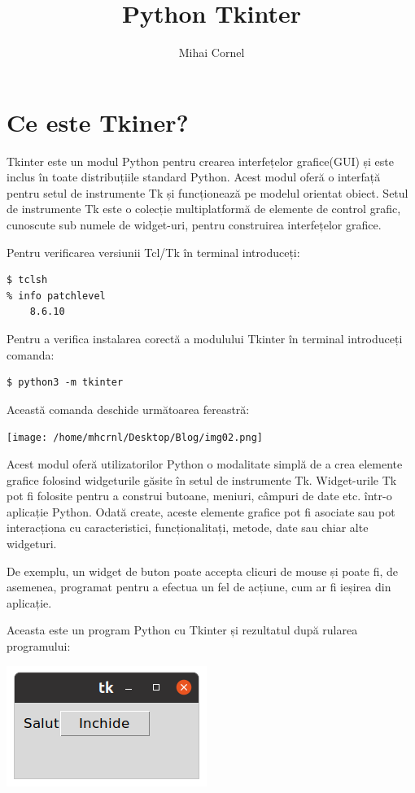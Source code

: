 \documentclass[12pt,a4paper]{book}
\author{Mihai Cornel}
\title{Python Tkinter}
\begin{document}
\section{Ce este Tkiner?}
	Tkinter este un modul Python pentru crearea interfețelor grafice(GUI) și este inclus în toate distribuțiile standard Python. Acest modul oferă o interfață pentru setul de instrumente Tk și funcționează pe modelul orientat obiect. Setul de instrumente Tk este o colecție multiplatformă de elemente de control grafic, cunoscute sub numele de widget-uri, pentru construirea interfețelor grafice.

Pentru verificarea versiunii Tcl/Tk în terminal introduceți:
\begin{verbatim}
$ tclsh
% info patchlevel
	8.6.10
\end{verbatim}

Pentru a verifica instalarea corectă a modulului Tkinter în terminal introduceți comanda:

\begin{verbatim}
$ python3 -m tkinter
\end{verbatim}

Această comanda deschide următoarea fereastră:

\texttt{[image: /home/mhcrnl/Desktop/Blog/img02.png]}

Acest modul oferă utilizatorilor Python o modalitate simplă de a crea elemente grafice folosind widgeturile găsite în setul de instrumente Tk.  Widget-urile Tk pot fi folosite pentru a construi butoane, meniuri, câmpuri de date etc. într-o aplicație Python.  Odată create, aceste elemente grafice pot fi asociate sau pot interacționa cu caracteristici, funcționalitați, metode, date sau chiar alte widgeturi. 

De exemplu, un widget de buton poate accepta clicuri de mouse și poate fi, de asemenea, programat pentru a efectua un fel de acțiune, cum ar fi ieșirea din aplicație.

Aceasta este un program Python cu Tkinter și rezultatul după rularea programului:

\includegraphics[width=\linewidth]{img01.png}
\end{document}
